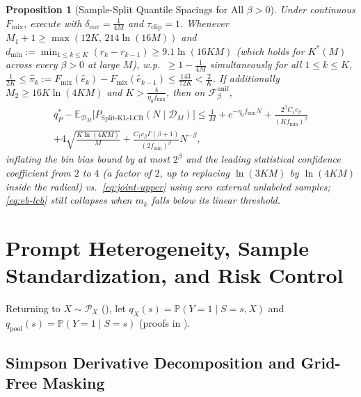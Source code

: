 \documentclass[10pt]{article}
\theoremstyle{plain}
\newtheorem{proposition}{Proposition}
\theoremstyle{definition}
\theoremstyle{remark}
\newcommand{\E}{\mathbb{E}}
\newcommand{\Prob}{\mathbb{P}}
\newcommand{\Fmix}{F_{\mathrm{mix}}}
\begin{document}
\begin{proposition}[Sample-Split Quantile Spacings for All $\beta > 0$]
\label{prop:spacings}
Under continuous $\Fmix$, execute  with $\delta_{\mathrm{cov}} = \frac{1}{4M}$ and $\tau_{\mathrm{clip}} = 1$. Whenever $M_1 + 1 \ge \max(12 K,\, 214\ln(16M))$ and $d_{\min} := \min_{1\le k\le K}(r_k - r_{k-1}) \ge 9.1\ln(16KM)$ (which holds for $K^*(M)$ across every $\beta > 0$ at large $M$), w.p.\ $\ge 1 - \frac{1}{4M}$ simultaneously for all $1 \le k \le K$, $\frac{1}{2K} \le \hat{\pi}_k := \Fmix(\hat{e}_k) - \Fmix(\hat{e}_{k-1}) \le \frac{143}{72 K} < \frac{2}{K}$. If additionally $M_2 \ge 16 K\ln(4KM)$ and $K > \frac{4}{\eta_0 f_{\min}}$, then on $\mathcal{F}_\beta^{\mathrm{unif}}$,
\begin{multline}
q^*_P - \E_{\mathcal{D}_M}\big[P_{\mathrm{Split\text{-}KL\text{-}LCB}}(N \mid \mathcal{D}_M)\big]
\le \frac{1}{M} + e^{-\eta_0 f_{\min} N} + \frac{2^\beta C_1 c_\beta}{(K f_{\min})^\beta} \\
+ 4\sqrt{\frac{K\ln(4KM)}{M}} + \frac{C_1 c_\beta\Gamma(\beta+1)}{(2 f_{\min})^\beta}N^{-\beta},
\end{multline}
inflating the bin bias bound by at most $2^\beta$ and the leading statistical confidence coefficient from $2$ to $4$ (a factor of $2$, up to replacing $\ln(3KM)$ by $\ln(4KM)$ inside the radical) vs.~\eqref{eq:joint-upper} using zero external unlabeled samples; \eqref{eq:eb-lcb} still collapses when $m_k$ falls below its linear threshold.
\end{proposition}

\section{Prompt Heterogeneity, Sample Standardization, and Risk Control}
\label{sec:heterogeneity}

Returning to $X \sim \mathcal{P}_X$ (), let $q_X(s) = \Prob(Y=1 \mid S=s, X)$ and $q_{\mathrm{pool}}(s) = \Prob(Y=1 \mid S=s)$ (proofs in ).

\subsection{Simpson Derivative Decomposition and Grid-Free Masking}
\end{document}
